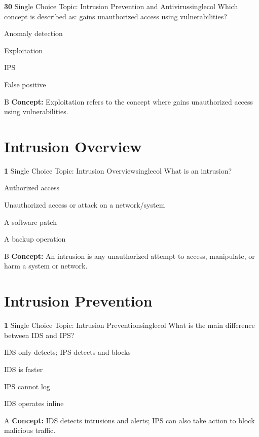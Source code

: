 \documentclass[10pt,a4paper]{article}
\begin{document}
\begin{qcard}{\color{white}\textbf{30} \hfill \small Single Choice \textbar{} Topic: Intrusion Prevention and Antivirus}{singlecol}
Which concept is described as: gains unauthorized access using vulnerabilities?

\begin{qoptions}
\item Anomaly detection
\item Exploitation
\item IPS
\item False positive
\end{qoptions}
\begin{explainbox}{B}
\textbf{Concept:} Exploitation refers to the concept where gains unauthorized access using vulnerabilities.
\end{explainbox}
\end{qcard}

\section{Intrusion Overview}
\begin{qcard}{\color{white}\textbf{1} \hfill \small Single Choice \textbar{} Topic: Intrusion Overview}{singlecol}
What is an intrusion?

\begin{qoptions}
\item Authorized access
\item Unauthorized access or attack on a network/system
\item A software patch
\item A backup operation
\end{qoptions}
\begin{explainbox}{B}
\textbf{Concept:} An intrusion is any unauthorized attempt to access, manipulate, or harm a system or network.
\end{explainbox}
\end{qcard}

\section{Intrusion Prevention}
\begin{qcard}{\color{white}\textbf{1} \hfill \small Single Choice \textbar{} Topic: Intrusion Prevention}{singlecol}
What is the main difference between IDS and IPS?

\begin{qoptions}
\item IDS only detects; IPS detects and blocks
\item IDS is faster
\item IPS cannot log
\item IDS operates inline
\end{qoptions}
\begin{explainbox}{A}
\textbf{Concept:} IDS detects intrusions and alerts; IPS can also take action to block malicious traffic.
\end{explainbox}
\end{qcard}
\end{document}
